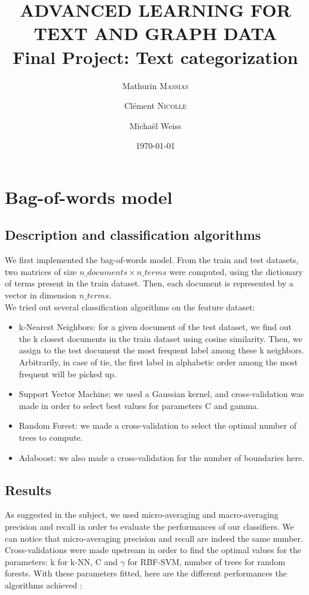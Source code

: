 \documentclass[11pt,a4paper]{article}
\title{ADVANCED LEARNING FOR TEXT AND GRAPH DATA \\ Final Project: Text categorization}
\author{Mathurin \textsc{Massias} \and Clément \textsc{Nicolle} \and Michaël Weiss}
\date{\today}
\begin{document}
	
\maketitle

\section{Bag-of-words model}

\subsection{Description and classification algorithms}

We first implemented the bag-of-words model. From the train and test datasets, two matrices of size $n\_documents \times n\_terms$ were computed, using the dictionary of terms present in the train dataset. Then, each document is represented by a vector in dimension $n\_terms$.
\\We tried out several classification algorithms on the feature dataset:
\begin{itemize}
	\item k-Nearest Neighbors: for a given document of the test dataset, we find out the k closest documents in the train dataset using cosine similarity. Then, we assign to the test document the most frequent label among these k neighbors. Arbitrarily, in case of tie, the first label in alphabetic order among the most frequent will be picked up.
	\item Support Vector Machine: we used a Gaussian kernel, and cross-validation was made in order to select best values for parameters C and gamma.
	\item Random Forest: we made a cross-validation to select the optimal number of trees to compute.
	\item Adaboost: we also made a cross-validation for the number of boundaries here.
\end{itemize}


\subsection{Results}

As suggested in the subject, we used micro-averaging and macro-averaging precision and recall in order to evaluate the performances of our classifiers. We can notice that micro-averaging precision and recall are indeed the same number.
\\Cross-validations were made upstream in order to find the optimal values for the parameters: k for k-NN, C and $\gamma$ for RBF-SVM, number of trees for random forests. With these parameters fitted, here are the different performances the algorithms achieved :
\end{document}
